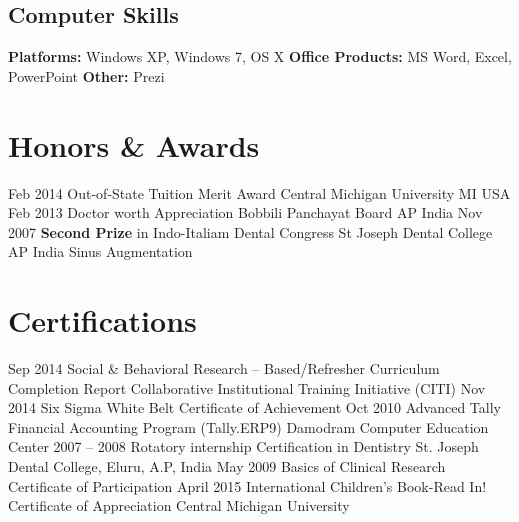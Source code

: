\documentclass[]{friggeri-cv} %
\begin{document}
\begin{aside} %
\section{Computer Skills\cite{paper}}
{\bf Platforms: } Windows XP, Windows 7, OS X
{\bf Office Products: }MS Word, Excel, PowerPoint
{\bf Other: }Prezi
\end{aside}
\newpage
\section{Honors \& Awards}
\begin{entrylist}
\entry
{Feb 2014}
{Out-of-State Tuition Merit Award}
{Central Michigan University MI USA}
{}
\entry
{Feb 2013}
{Doctor worth Appreciation}
{Bobbili Panchayat Board AP India}
{}
\entry
{Nov 2007}
{{\bf Second Prize } in Indo-Italiam Dental Congress}
{St Joseph Dental College AP India}
{Sinus Augmentation}
\end{entrylist}

\section{Certifications}
\begin{entrylist}
\entry
{Sep 2014}
{Social \& Behavioral Research -- Based/Refresher Curriculum Completion Report}
{}
{Collaborative Institutional Training Initiative (CITI)}
\entry
{Nov 2014}
{Six Sigma White Belt Certificate of Achievement}
{}
{}
\entry
{Oct 2010}
{Advanced Tally Financial Accounting  Program (Tally.ERP9)}
{Damodram Computer Education Center}
{}
\entry
{2007 -- 2008}
{Rotatory internship Certification in Dentistry}
{St. Joseph Dental College, Eluru, A.P, India}
{}
\entry
{May 2009}
{Basics of Clinical Research}
{Certificate of Participation}
{}
\entry
{April 2015}
{International Children's Book-Read In!}
{Certificate of Appreciation}
{Central Michigan University}
\end{entrylist}
\end{document}
